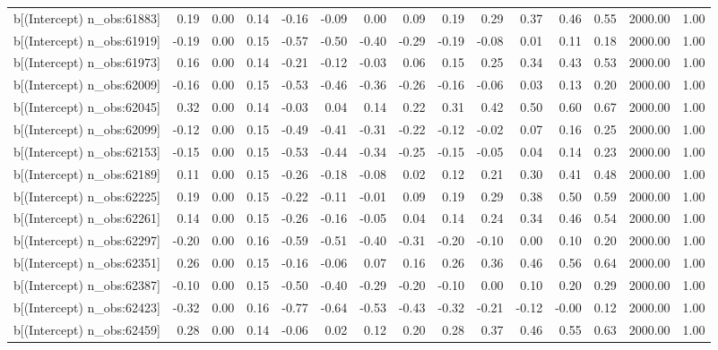 \begin{table}[ht]
\begin{tabular}{rrrrrrrrrrrrrrr}
  b[(Intercept) n\_obs:61883] & 0.19 & 0.00 & 0.14 & -0.16 & -0.09 & 0.00 & 0.09 & 0.19 & 0.29 & 0.37 & 0.46 & 0.55 & 2000.00 & 1.00 \\ 
  b[(Intercept) n\_obs:61919] & -0.19 & 0.00 & 0.15 & -0.57 & -0.50 & -0.40 & -0.29 & -0.19 & -0.08 & 0.01 & 0.11 & 0.18 & 2000.00 & 1.00 \\ 
  b[(Intercept) n\_obs:61973] & 0.16 & 0.00 & 0.14 & -0.21 & -0.12 & -0.03 & 0.06 & 0.15 & 0.25 & 0.34 & 0.43 & 0.53 & 2000.00 & 1.00 \\ 
  b[(Intercept) n\_obs:62009] & -0.16 & 0.00 & 0.15 & -0.53 & -0.46 & -0.36 & -0.26 & -0.16 & -0.06 & 0.03 & 0.13 & 0.20 & 2000.00 & 1.00 \\ 
  b[(Intercept) n\_obs:62045] & 0.32 & 0.00 & 0.14 & -0.03 & 0.04 & 0.14 & 0.22 & 0.31 & 0.42 & 0.50 & 0.60 & 0.67 & 2000.00 & 1.00 \\ 
  b[(Intercept) n\_obs:62099] & -0.12 & 0.00 & 0.15 & -0.49 & -0.41 & -0.31 & -0.22 & -0.12 & -0.02 & 0.07 & 0.16 & 0.25 & 2000.00 & 1.00 \\ 
  b[(Intercept) n\_obs:62153] & -0.15 & 0.00 & 0.15 & -0.53 & -0.44 & -0.34 & -0.25 & -0.15 & -0.05 & 0.04 & 0.14 & 0.23 & 2000.00 & 1.00 \\ 
  b[(Intercept) n\_obs:62189] & 0.11 & 0.00 & 0.15 & -0.26 & -0.18 & -0.08 & 0.02 & 0.12 & 0.21 & 0.30 & 0.41 & 0.48 & 2000.00 & 1.00 \\ 
  b[(Intercept) n\_obs:62225] & 0.19 & 0.00 & 0.15 & -0.22 & -0.11 & -0.01 & 0.09 & 0.19 & 0.29 & 0.38 & 0.50 & 0.59 & 2000.00 & 1.00 \\ 
  b[(Intercept) n\_obs:62261] & 0.14 & 0.00 & 0.15 & -0.26 & -0.16 & -0.05 & 0.04 & 0.14 & 0.24 & 0.34 & 0.46 & 0.54 & 2000.00 & 1.00 \\ 
  b[(Intercept) n\_obs:62297] & -0.20 & 0.00 & 0.16 & -0.59 & -0.51 & -0.40 & -0.31 & -0.20 & -0.10 & 0.00 & 0.10 & 0.20 & 2000.00 & 1.00 \\ 
  b[(Intercept) n\_obs:62351] & 0.26 & 0.00 & 0.15 & -0.16 & -0.06 & 0.07 & 0.16 & 0.26 & 0.36 & 0.46 & 0.56 & 0.64 & 2000.00 & 1.00 \\ 
  b[(Intercept) n\_obs:62387] & -0.10 & 0.00 & 0.15 & -0.50 & -0.40 & -0.29 & -0.20 & -0.10 & 0.00 & 0.10 & 0.20 & 0.29 & 2000.00 & 1.00 \\ 
  b[(Intercept) n\_obs:62423] & -0.32 & 0.00 & 0.16 & -0.77 & -0.64 & -0.53 & -0.43 & -0.32 & -0.21 & -0.12 & -0.00 & 0.12 & 2000.00 & 1.00 \\ 
  b[(Intercept) n\_obs:62459] & 0.28 & 0.00 & 0.14 & -0.06 & 0.02 & 0.12 & 0.20 & 0.28 & 0.37 & 0.46 & 0.55 & 0.63 & 2000.00 & 1.00 \\ 

\end{tabular}
\end{table}
